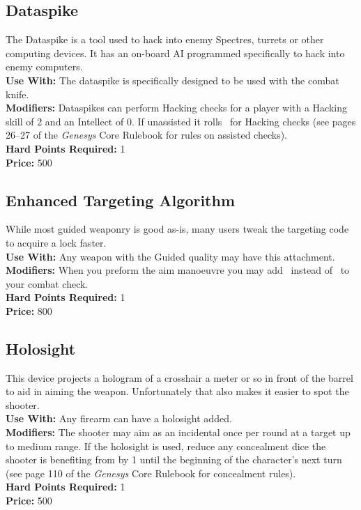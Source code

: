 \subsection{Dataspike}
The Dataspike is a tool used to hack into enemy Spectres, turrets or other computing devices. It has an on-board AI programmed specifically to hack into enemy computers. \\
\noindent\textbf{Use With:} The dataspike is specifically designed to be used with the combat knife.\\
\noindent\textbf{Modifiers:} Dataspikes can perform Hacking checks for a player with a Hacking skill of 2 and an Intellect of 0. If unassisted it rolls \AbilityDie\AbilityDie\ for Hacking checks (see pages 26--27 of the \emph{Genesys} Core Rulebook for rules on assisted checks).\\
\noindent\textbf{Hard Points Required:} 1\\
\noindent\textbf{Price:} 500

\subsection{Enhanced Targeting Algorithm}
While most guided weaponry is good as-is, many users tweak the targeting code to acquire a lock faster.\\
\noindent\textbf{Use With:} Any weapon with the Guided quality may have this attachment.\\
\noindent\textbf{Modifiers:} When you preform the aim manoeuvre you may add \Advantage\ instead of \BoostDie\ to your combat check.\\
\noindent\textbf{Hard Points Required:} 1\\
\noindent\textbf{Price:} 800


\subsection{Holosight}
This device projects a hologram of a crosshair a meter or so in front of the barrel to aid in aiming the weapon. Unfortunately that also makes it easier to spot the shooter.\\
\noindent\textbf{Use With:} Any firearm can have a holosight added.\\
\noindent\textbf{Modifiers:} The shooter may aim as an incidental once per round at a target up to medium range. If the holosight is used, reduce any concealment dice the shooter is benefiting from by 1 until the beginning of the character's next turn (see page 110 of the \emph{Genesys} Core Rulebook for concealment rules).\\
\noindent\textbf{Hard Points Required:} 1\\
\noindent\textbf{Price:} 500

